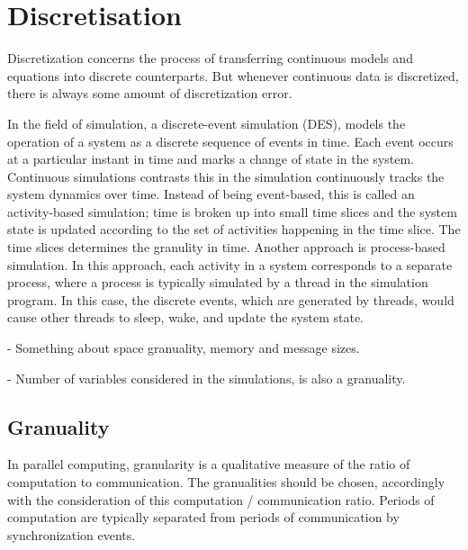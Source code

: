 \section{Discretisation}
\label{dis}

Discretization concerns the process of transferring continuous models and equations into discrete counterparts. But whenever continuous data is discretized, there is always some amount of discretization error.

In the field of simulation, a discrete-event simulation (DES), models the operation of a system as a discrete sequence of events in time. Each event occurs at a particular instant in time and marks a change of state in the system.
Continuous simulations contrasts this in the simulation continuously tracks the system dynamics over time. Instead of being event-based, this is called an activity-based simulation; time is broken up into small time slices and the system state is updated according to the set of activities happening in the time slice. The time slices determines the granulity in time.
Another approach is process-based simulation. In this approach, each activity in a system corresponds to a separate process, where a process is typically simulated by a thread in the simulation program. In this case, the discrete events, which are generated by threads, would cause other threads to sleep, wake, and update the system state.

- Something about space granuality, memory and message sizes.

- Number of variables considered in the simulations, is also a granuality.

\subsection{Granuality}
In parallel computing, granularity is a qualitative measure of the ratio of computation to communication. The granualities should be chosen, accordingly with the consideration of this computation / communication ratio. Periods of computation are typically separated from periods of communication by synchronization events.

